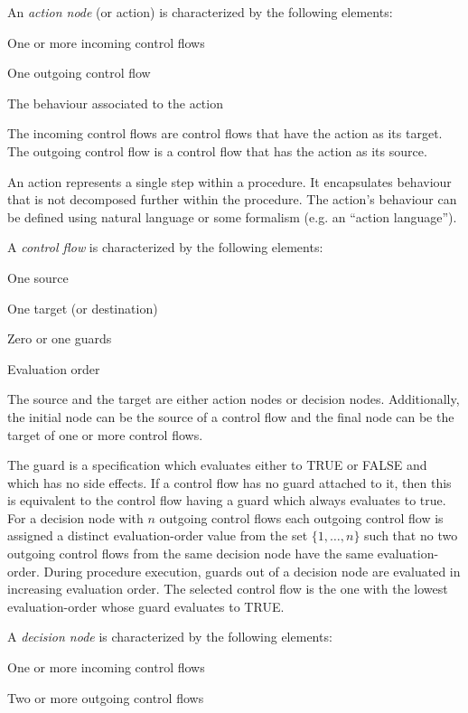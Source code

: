 \documentclass[definition]{../fwprofile}
\begin{document}
An \emph{action node} (or action) is characterized by the following elements:

\begin{fw_itemize} 
\item One or more incoming control flows
\item One outgoing control flow
\item The behaviour associated to the action
\end{fw_itemize}

The incoming control flows are control flows that have the action as its target. The outgoing
control flow is a control flow that has the action as its source.

An action represents a single step within a procedure. It encapsulates behaviour that is not
decomposed further within the procedure. The action's behaviour can be defined using natural
language or some formalism (e.g. an “action language”).

A \emph{control flow} is characterized by the following elements:

\begin{fw_itemize} 
\item One source
\item One target (or destination)
\item Zero or one guards
\item Evaluation order
\end{fw_itemize}

The source and the target are either action nodes or decision nodes. Additionally, the initial
node can be the source of a control flow and the final node can be the target of one or
more control flows.

The guard is a specification which evaluates either to TRUE or FALSE and which
has no side effects. If a control flow has no guard attached to it, then this is equivalent to the control flow having a guard which always evaluates to true.
For a decision node with $n$ outgoing control flows each outgoing control flow is assigned a distinct evaluation-order value
from the set $\{1,\ldots,n\}$ such that no two outgoing control flows
from the same decision node have the same evaluation-order. During procedure execution, guards out of a decision node are evaluated in increasing evaluation order.
The selected control flow is the one with the lowest evaluation-order whose guard evaluates to TRUE.

A \emph{decision node} is characterized by the following elements:
\begin{fw_itemize} 
\item One or more incoming control flows
\item Two or more outgoing control flows
\end{fw_itemize}
\end{document}

